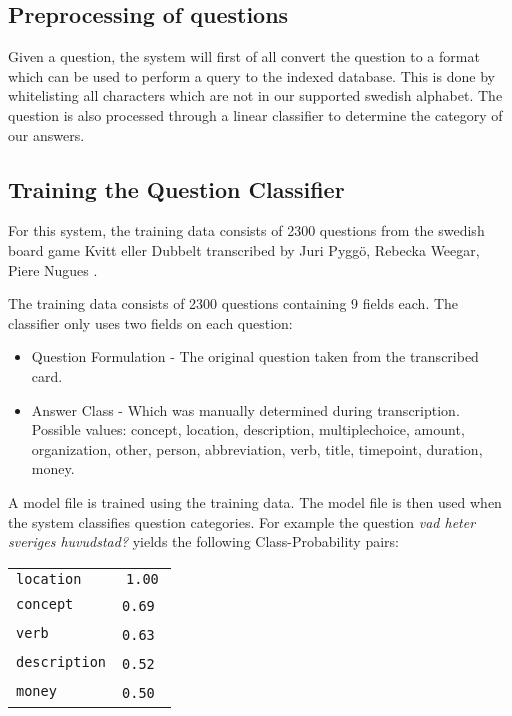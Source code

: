 \subsection{Preprocessing of questions}
Given a question, the system will first of all convert the question
to a format which can be used to perform a query to the indexed
database. This is done by whitelisting all characters which
are not in our supported swedish alphabet. The question is also
processed through a linear classifier to determine the category of our 
answers.

\subsection{Training the Question Classifier}
For this system, the training data consists of 2300 questions 
from the swedish board game Kvitt eller Dubbelt transcribed 
by Juri Pygg\"o, Rebecka Weegar, Piere Nugues \cite{QASYS}.

The training data consists of 2300 questions containing 9 fields each.
The classifier only uses two fields on each question:
\begin{itemize}
\item Question Formulation - The original question taken from the transcribed
  card.
\item Answer Class - Which was manually determined during transcription. 
  Possible values: concept, location, description, multiplechoice, amount, organization, 
  other, person, abbreviation, verb, title, timepoint, duration, money.
\end{itemize}
A model file is trained using the training data. The model file is then used when the system 
classifies question categories. For example the question \textit{vad heter sveriges huvudstad?} 
yields the following Class-Probability pairs:
\begin{center}
  \begin{tabular} {l c}
    \texttt{location}    & \texttt{1.00} \\
    \texttt{concept}     & \texttt{0.69} \\
    \texttt{verb}        & \texttt{0.63} \\
    \texttt{description} & \texttt{0.52} \\
    \texttt{money}       & \texttt{0.50} \\
  \end{tabular}
\end{center}
